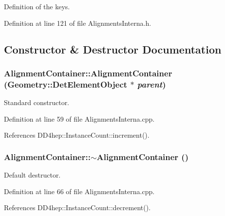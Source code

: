 Definition of the keys. 

Definition at line 121 of file AlignmentsInterna.h.

\subsection{Constructor \& Destructor Documentation}
\hypertarget{class_d_d4hep_1_1_alignments_1_1_interna_1_1_alignment_container_a360f49ea724e7c446c8b81adfbac8c85}{
\subsubsection[{AlignmentContainer}]{\setlength{\rightskip}{0pt plus 5cm}AlignmentContainer::AlignmentContainer ({\bf Geometry::DetElementObject} $\ast$ {\em parent})}}
\label{class_d_d4hep_1_1_alignments_1_1_interna_1_1_alignment_container_a360f49ea724e7c446c8b81adfbac8c85}


Standard constructor. 

Definition at line 59 of file AlignmentsInterna.cpp.

References DD4hep::InstanceCount::increment().\hypertarget{class_d_d4hep_1_1_alignments_1_1_interna_1_1_alignment_container_ab3390799871933e6408bbe0c0ff41444}{
\subsubsection[{$\sim$AlignmentContainer}]{\setlength{\rightskip}{0pt plus 5cm}AlignmentContainer::$\sim$AlignmentContainer ()}}
\label{class_d_d4hep_1_1_alignments_1_1_interna_1_1_alignment_container_ab3390799871933e6408bbe0c0ff41444}


Default destructor. 

Definition at line 66 of file AlignmentsInterna.cpp.

References DD4hep::InstanceCount::decrement().


